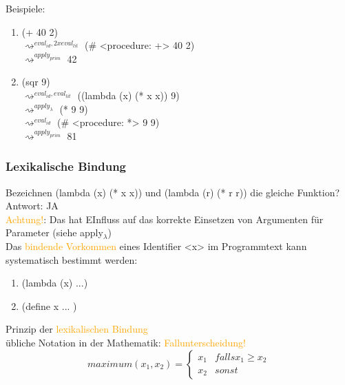 \documentclass[paper=a4, fontsize=11pt]{scrartcl}
\numberwithin{equation}{section}
\numberwithin{figure}{section}
\numberwithin{table}{section}
\begin{document}
Beispiele: 
\begin{enumerate}
\item (+ 40 2) \\
         $\rightsquigarrow^{eval_{id}, 2x eval_{lit}}$ (\# <procedure: +> 40 2) \\
         $\rightsquigarrow^{apply_{prim}}$ 42
\item (sqr 9) \\
         $\rightsquigarrow^{eval_{id},eval_{lit}}$ ((lambda (x) (* x x)) 9) \\
         $\rightsquigarrow^{apply_{\lambda}}$ (* 9 9) \\
         $\rightsquigarrow^{eval_{id}}$ (\# <procedure: *> 9 9) \\
         $\rightsquigarrow^{apply_{prim}}$ 81        
\end{enumerate}
\subsubsection{Lexikalische Bindung}
Bezeichnen (lambda (x) (* x x)) und (lambda (r) (* r r)) die gleiche Funktion? \\
Antwort: JA \\
\textcolor{orange}{Achtung!}: Das hat EInfluss auf das korrekte Einsetzen von Argumenten für Parameter (siehe apply$_{\lambda}$) \\
Das \textcolor{orange}{bindende Vorkommen} eines Identifier <x> im Programmtext kann systematisch bestimmt werden:
\begin{enumerate}
\item (lambda (x) ...)
\item (define x ... )
\end{enumerate}
Prinzip der \textcolor{orange}{lexikalischen Bindung} \\
übliche Notation in der Mathematik: \textcolor{orange}{Fallunterscheidung!} \\

$$maximum(x_{1},x_{2}) = 
\begin{cases}
x_{1} & falls x_{1} \geq x_{2} \\
x_{2} & sonst
\end{cases}$$
\end{document}
